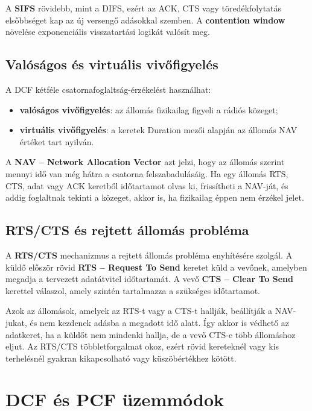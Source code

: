 A \textbf{SIFS} rövidebb, mint a DIFS, ezért az ACK, CTS vagy töredékfolytatás elsőbbséget kap az új versengő adásokkal szemben. A \textbf{contention window} növelése exponenciális visszatartási logikát valósít meg.



\subsection{Valóságos és virtuális vivőfigyelés}

A DCF kétféle csatornafoglaltság-érzékelést használhat:

\begin{itemize}
  \item \textbf{valóságos vivőfigyelés}: az állomás fizikailag figyeli a rádiós közeget;
  \item \textbf{virtuális vivőfigyelés}: a keretek Duration mezői alapján az állomás NAV értéket tart nyilván.
\end{itemize}

A \textbf{NAV -- Network Allocation Vector} azt jelzi, hogy az állomás szerint mennyi idő van még hátra a csatorna felszabadulásáig. Ha egy állomás RTS, CTS, adat vagy ACK keretből időtartamot olvas ki, frissítheti a NAV-ját, és addig foglaltnak tekinti a közeget, akkor is, ha fizikailag éppen nem érzékel jelet.

\subsection{RTS/CTS és rejtett állomás probléma}

A \textbf{RTS/CTS} mechanizmus a rejtett állomás probléma enyhítésére szolgál. A küldő először rövid \textbf{RTS -- Request To Send} keretet küld a vevőnek, amelyben megadja a tervezett adatátvitel időtartamát. A vevő \textbf{CTS -- Clear To Send} kerettel válaszol, amely szintén tartalmazza a szükséges időtartamot.

Azok az állomások, amelyek az RTS-t vagy a CTS-t hallják, beállítják a NAV-jukat, és nem kezdenek adásba a megadott idő alatt. Így akkor is védhető az adatkeret, ha a küldőt nem mindenki hallja, de a vevő CTS-e több állomáshoz eljut. Az RTS/CTS többletforgalmat okoz, ezért rövid kereteknél vagy kis terhelésnél gyakran kikapcsolható vagy küszöbértékhez kötött.



\section{DCF és PCF üzemmódok}

